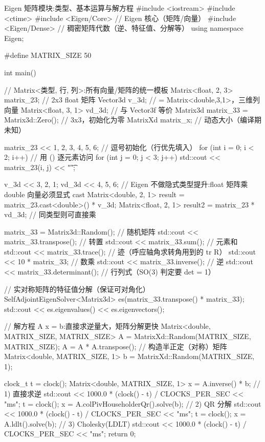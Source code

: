 \begin{codebox}[C++]{Eigen 矩阵模块:类型、基本运算与解方程}
#include <iostream>
#include <ctime>
#include <Eigen/Core>     // Eigen 核心（矩阵/向量）
#include <Eigen/Dense>    // 稠密矩阵代数（逆、特征值、分解等）
using namespace Eigen;

#define MATRIX_SIZE 50

int main() {
    // Matrix<类型, 行, 列>:所有向量/矩阵的统一模板
    Matrix<float, 2, 3> matrix_23;          // 2x3 float 矩阵
    Vector3d v_3d;                          // = Matrix<double,3,1>，三维列向量
    Matrix<float, 3, 1> vd_3d;              // 与 Vector3f 等价
    Matrix3d matrix_33 = Matrix3d::Zero();  // 3x3，初始化为零
    MatrixXd matrix_x;                      // 动态大小（编译期未知）

    matrix_23 << 1, 2, 3, 4, 5, 6;          // 逗号初始化（行优先填入）
    for (int i = 0; i < 2; i++)             // 用 () 逐元素访问
        for (int j = 0; j < 3; j++) std::cout << matrix_23(i, j) << "\t";

    v_3d << 3, 2, 1;
    vd_3d << 4, 5, 6;
    // Eigen 不做隐式类型提升:float 矩阵乘 double 向量必须显式 cast
    Matrix<double, 2, 1> result = matrix_23.cast<double>() * v_3d;
    Matrix<float, 2, 1> result2 = matrix_23 * vd_3d;   // 同类型则可直接乘

    matrix_33 = Matrix3d::Random();         // 随机矩阵
    std::cout << matrix_33.transpose();     // 转置
    std::cout << matrix_33.sum();           // 元素和
    std::cout << matrix_33.trace();         // 迹（呼应轴角求转角用到的 tr R）
    std::cout << 10 * matrix_33;            // 数乘
    std::cout << matrix_33.inverse();       // 逆
    std::cout << matrix_33.determinant();   // 行列式（SO(3) 判定要 det = 1）

    // 实对称矩阵的特征值分解（保证可对角化）
    SelfAdjointEigenSolver<Matrix3d> es(matrix_33.transpose() * matrix_33);
    std::cout << es.eigenvalues() << es.eigenvectors();

    // 解方程 A x = b:直接求逆量大，矩阵分解更快
    Matrix<double, MATRIX_SIZE, MATRIX_SIZE> A
        = MatrixXd::Random(MATRIX_SIZE, MATRIX_SIZE);
    A = A * A.transpose();                   // 构造半正定（对称）矩阵
    Matrix<double, MATRIX_SIZE, 1> b = MatrixXd::Random(MATRIX_SIZE, 1);

    clock_t t = clock();
    Matrix<double, MATRIX_SIZE, 1> x = A.inverse() * b;          // 1) 直接求逆
    std::cout << 1000.0 * (clock() - t) / CLOCKS_PER_SEC << "ms";
    t = clock();
    x = A.colPivHouseholderQr().solve(b);                        // 2) QR 分解
    std::cout << 1000.0 * (clock() - t) / CLOCKS_PER_SEC << "ms";
    t = clock();
    x = A.ldlt().solve(b);                                       // 3) Cholesky(LDLT)
    std::cout << 1000.0 * (clock() - t) / CLOCKS_PER_SEC << "ms";
    return 0;
}
\end{codebox}

